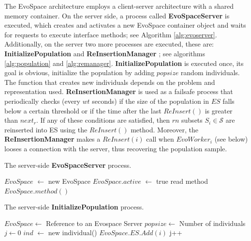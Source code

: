 The EvoSpace architecture employs a client-server architecture with a shared memory container.
On the server side, a process called \textbf{EvoSpaceServer} is executed, which creates and activates a new EvoSpace
container object and waits for requests to execute interface methods; see Algorithm \ref{alg:evoserver}.
Additionally, on the server two more processes are executed, these are: \textbf{InitializePopulation} and \textbf{ReInsertionManager} ;
see algorithms \ref{alg:population} and \ref{alg:remanager}.
\textbf{InitializePopulation} is executed once, its goal is obvious, initialize the population by adding $popsize$ random
individuals. The function that creates new individuals depends on the problem and representation used.
\textbf{ReInsertionManager} is used as a failsafe process that periodically checks (every $wt$ seconds) if the size of the population in $ES$
falls below a certain threshold or if the time after the last $ReInsert()$ is greater than $next_r$.
If any of these conditions are satisfied, then $rn$ subsets $S_i \in \mathcal{S}$ are reinserted into ES using the $ReInsert()$ method.
Moreover, the \textbf{ReInsertionManager} makes a $ReInsert(i)$ call when $EvoWorker_i$ (see below) looses a connection with the server,
thus recovering the population sample.
\begin{algorithm}[t]
\label{alg:evoserver}
\caption{The server-side \textbf{EvoSpaceServer} process.}
\begin{algorithmic}
\STATE $EvoSpace$ $\leftarrow$ new EvoSpace
\STATE $EvoSpace.active$ $\leftarrow$ true
\STATE read method
\RETURN $EvoSpace.method()$
\ENDWHILE
\end{algorithmic}
\end{algorithm}


\begin{algorithm}[t]
\label{alg:population}
\caption{The server-side \textbf{InitializePopulation} process.}
\begin{algorithmic}
\REQUIRE $EvoSpace \leftarrow$ Reference to an Evospace Server
\REQUIRE $popsize \leftarrow$ Number of individuals
\STATE $j \leftarrow 0$
\STATE $ind$ $\leftarrow$ new individual() 
\STATE $EvoSpace.ES.Add(i)$
\STATE j++
\ENDFOR
\end{algorithmic}
\end{algorithm}

